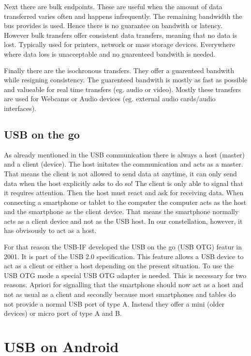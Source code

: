 Next there are bulk endpoints. These are useful when the amount of data transferred varies often and happens infrequently. The remaining bandwidth the bus provides is used. Hence there is no guarantee on bandwith or latency. However bulk transfers offer consistent data transfers, meaning that no data is lost. Typically used for printers, network or mass storage devices. Everywhere where data loss is unacceptable and no guarenteed bandwith is needed.

Finally there are the isochronous transfers. They offer a guarenteed bandwith while resigning consistency. The guarenteed bandwith is mostly as fast as possible and valueable for real time transfers (eg. audio or video). Mostly these transfers are used for Webcams or Audio devices (eg. external audio cards/audio interfaces).

\section{USB on the go}

As already mentioned in the USB communication there is always a host (master) and a client (device). The host initates the communication and acts as a master. That means the client is not allowed to send data at anytime, it can only send data when the host explicitly asks to do so! The client is only able to signal that it requires attention. Then the host must react and ask for receiving data. When connecting a smartphone or tablet to the computer the computer acts as the host and the smartphone as the client device. That means the smartphone normally acts as a client device and not as the USB host. In our constellation, however, it has obvisously to act as a host. 

For that reason the USB-IF developed the USB on the go (USB OTG) featur in 2001. It is part of the USB 2.0 specification. This feature allows a USB device to act as a client or either a host depending on the present situation. To use the USB OTG mode a special USB OTG adapter is needed. This is necessary for two reasons. Apriori for signalling that the smartphone should now act as a host and not as usual as a client and secondly because most smartphones and tables do not provide a normal USB port of type A. Instead they offer a mini (older devices) or micro port of type A and B. 

\chapter{USB on Android}

